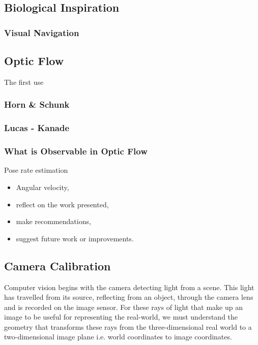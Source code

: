 \documentclass{UoNMCHA}
\numberwithin{equation}{section}
\begin{document}
\subsection{Biological Inspiration} %
\subsubsection{Visual Navigation}
\subsubsection{}
\subsubsection{}
\subsection{Optic Flow} %
The first use
\subsubsection{Horn \& Schunk}
\subsubsection{Lucas - Kanade}
\subsubsection{What is Observable in Optic Flow}
Pose rate estimation

\begin{itemize}
	\item Angular velocity,
	\item reflect on the work presented, 
	\item make recommendations,
	\item suggest future work or improvements.
\end{itemize}

\newpage
\subsection{Camera Calibration}
Computer vision begins with the camera detecting light from a scene. This light has travelled from its source, reflecting from an object, through the camera lens and is recorded on the image sensor. For these rays of light that make up an image to be useful for representing the real-world, we must understand the geometry that transforms these rays from the three-dimensional real world to a two-dimensional image plane i.e. world coordinates to image coordinates.
\end{document}
